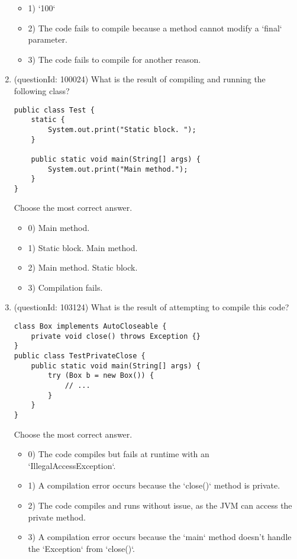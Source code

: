 \documentclass[12pt]{article}
\begin{document}
\begin{enumerate}[label=(\arabic*)]
\begin{itemize}
\item 1) `100`

\item 2) The code fails to compile because a method cannot modify a `final` parameter.

\item 3) The code fails to compile for another reason.

\end{itemize}
\item (questionId: 100024) What is the result of compiling and running the following class?
\begin{verbatim}
public class Test {
    static {
        System.out.print("Static block. ");
    }

    public static void main(String[] args) {
        System.out.print("Main method.");
    }
}
\end{verbatim}
Choose the most correct answer. 
\begin{itemize}
\item 0) Main method.

\item 1) Static block. Main method.

\item 2) Main method. Static block.

\item 3) Compilation fails.

\end{itemize}
\item (questionId: 103124) What is the result of attempting to compile this code?
\begin{verbatim}
class Box implements AutoCloseable {
    private void close() throws Exception {}
}
public class TestPrivateClose {
    public static void main(String[] args) {
        try (Box b = new Box()) {
            // ...
        }
    }
}
\end{verbatim}
Choose the most correct answer. 
\begin{itemize}
\item 0) The code compiles but fails at runtime with an `IllegalAccessException`.

\item 1) A compilation error occurs because the `close()` method is private.

\item 2) The code compiles and runs without issue, as the JVM can access the private method.

\item 3) A compilation error occurs because the `main` method doesn't handle the `Exception` from `close()`.


\end{itemize}
\end{enumerate}
\end{document}
